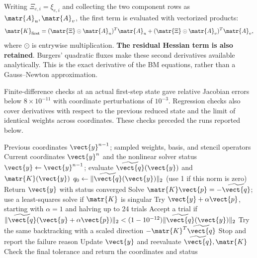Writing $\Xi_{e,i}=\xi_{e,i}$ and collecting the two component rows as $\matr{A}_u,\matr{A}_v$, the first term is evaluated with vectorized products:
\begin{equation}
 \matr{K}_{\mathrm{first}}=(\matr{\Xi}\odot \matr{A}_u)^T\matr{A}_u+(\matr{\Xi}\odot \matr{A}_v)^T\matr{A}_v,
\end{equation}
where $\odot$ is entrywise multiplication. \textbf{The residual Hessian term is also retained}. Burgers' quadratic fluxes make these second derivatives available analytically. This is the exact derivative of the BM equations, rather than a Gauss--Newton approximation.

Finite-difference checks at an actual first-step state gave relative Jacobian errors below $8\times10^{-11}$ with coordinate perturbations of $10^{-3}$. Regression checks also cover derivatives with respect to the previous reduced state and the limit of identical weights across coordinates. These checks preceded the runs reported below.

\begin{algorithm}[H]
 \caption{One BM-ECSW time step}
 \label{alg:impl-online}
 \small
 \begin{algorithmic}[1]
  \Require Previous coordinates $\vect{y}^{n-1}$; sampled weights, basis, and stencil operators
  \Ensure Current coordinates $\vect{y}^n$ and the nonlinear solver status
  \State $\vect{y}\gets \vect{y}^{n-1}$; evaluate $\widetilde{\vect{q}}(\vect{y})$ and $\matr{K}(\vect{y})$
  \State $q_0\gets\|\widetilde{\vect{q}}(\vect{y})\|_2$ (use 1 if this norm is zero)
    \State Return $\vect{y}$ with status converged
   \EndIf
   \State Solve $\matr{K}\vect{p}=-\widetilde{\vect{q}}$; use a least-squares solve if $\matr{K}$ is singular
   \State Try $\vect{y}+\alpha \vect{p}$, starting with $\alpha=1$ and halving up to 24 trials
   \State Accept a trial if $\|\widetilde{\vect{q}}(\vect{y}+\alpha \vect{p})\|_2<(1-10^{-12})\|\widetilde{\vect{q}}(\vect{y})\|_2$
    \State Try the same backtracking with a scaled direction $-\matr{K}^T\widetilde{\vect{q}}$
   \EndIf
    \State Stop and report the failure reason
   \EndIf
   \State Update $\vect{y}$ and reevaluate $\widetilde{\vect{q}},\matr{K}$
  \EndFor
  \State Check the final tolerance and return the coordinates and status
 \end{algorithmic}
\end{algorithm}

